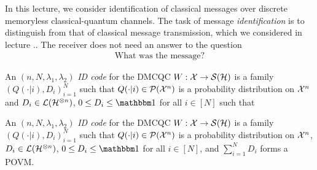 In this lecture, we consider identification of classical messages over discrete memoryless classical-quantum channels. The task of message
\emph{identification} is to distinguish from that of classical message transmission, which we considered in lecture .. The receiver does not 
need an answer to the question 
\begin{align*}
 \text{What was the message?} 
\end{align*}





\begin{definition} \label{def:id_code}
An $(n,N,\lambda_1,\lambda_2)$ \emph{ID code} for the DMCQC $W: {\mathcal X} \rightarrow {\mathcal S}({\mathcal H})$ is a family $(Q(\cdot|i), D_i)_{i=1}^N$ such that 
$Q(\cdot|i) \in {\mathcal P}({\mathcal X}^n)$ is a probability distribution on ${\mathcal X}^n$ and $D_i \in {\mathcal L}({\mathcal H}^{\otimes n})$, $0 \leq D_i \leq \bbmeins$ for all 
$i \in [N]$ such that 
\end{definition}

\begin{definition} \label{def:sim_id_code}
An $(n,N,\lambda_1,\lambda_2)$ \emph{ID code} for the DMCQC $W: {\mathcal X} \rightarrow {\mathcal S}({\mathcal H})$ is a family $(Q(\cdot|i), D_i)_{i=1}^N$ such that 
$Q(\cdot|i) \in {\mathcal P}({\mathcal X}^n)$ is a probability distribution on ${\mathcal X}^n$, $D_i \in {\mathcal L}({\mathcal H}^{\otimes n})$, $0 \leq D_i \leq \bbmeins$ for all 
$i \in [N]$, and $\sum_{i=1}^N D_i$ forms a POVM.
\end{definition}
